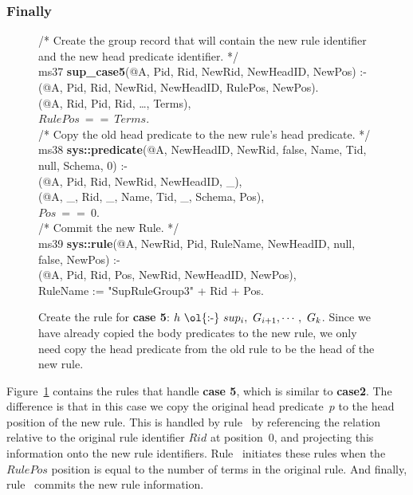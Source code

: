 \subsubsection{Finally}

\begin{figure}[!t]
\ssp
\centering
\begin{boxedminipage}{\linewidth}
/* Create the group record that will contain the new rule identifier \\
and the new head predicate identifier. */ \\
ms37 {\bf sup\_case5}(@A, Pid, Rid, NewRid, NewHeadID, NewPos) :- \\
(@A, Pid, Rid, NewRid, NewHeadID, RulePos, NewPos). \\
(@A, Rid, Pid, Rid, \ldots, Terms), \\
\datalogspace $RulePos\ ==\ Terms$. \\
	
/* Copy the old head predicate to the new rule's head predicate. */ \\
ms38 {\bf sys::predicate}(@A, NewHeadID, NewRid, false, Name, Tid, null, Schema, 0) :- \\
(@A, Pid, Rid, NewRid, NewHeadID, \_), \\
(@A, \_, Rid, \_, Name, Tid, \_, Schema, Pos), \\
\datalogspace $Pos\ ==\ 0$. \\
	
/* Commit the new Rule. */ \\
ms39 {\bf sys::rule}(@A, NewRid, Pid, RuleName, NewHeadID, null, false, NewPos) :- \\
(@A, Pid, Rid, Pos, NewRid, NewHeadID, NewPos), \\
\datalogspace RuleName := "SupRuleGroup3" + Rid + Pos.

\end{boxedminipage}
\caption{\label{ch:magic:fig:rewrite9} 
Create the rule for {\bf case 5}: $h\ \text{\ol{:-}}\ sup_i,\ G_{i+1}, \cdots,\ G_k$. 
Since we have already copied the body predicates to the new rule, we only
need copy the head predicate from the old rule to be the head of the new rule.}
\end{figure}

Figure~\ref{ch:magic:fig:rewrite9} contains the rules that handle {\bf case 5},
which is similar to {\bf case2}.  The difference is that in this case we copy
the original head predicate~$p$ to the head position of the new rule.  This is
handled by rule~ by referencing the  relation relative
to the original rule identifier $Rid$ at position~$0$, and projecting this
information onto the new rule identifiers.  Rule~ initiates these
rules when the $RulePos$ position is equal to the number of terms in the
original rule.  And finally, rule~ commits the new rule information.

